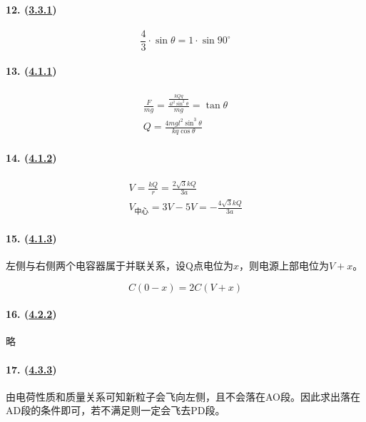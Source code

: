 \paragraph{12. (\hyperref[subsec:3.3.1]{3.3.1})}

\begin{equation*}
    \frac43\cdot\sin\theta=1\cdot\sin90^\circ
\end{equation*}

\paragraph{13. (\hyperref[subsec:4.1.1]{4.1.1})}

\begin{gather*}
    \frac{F}{mg}=\frac{\frac{kQq}{4l^2\sin^2\theta}}{mg}=\tan\theta\\
    Q=\frac{4mgl^2\sin^3\theta}{kq\cos\theta}
\end{gather*}

\paragraph{14. (\hyperref[subsec:4.1.2]{4.1.2})}

\begin{gather*}
    V=\frac{kQ}{r}=\frac{2\sqrt{3}kQ}{3a}\\
    V_\textrm{中心}=3V-5V=-\frac{4\sqrt{3}kQ}{3a}
\end{gather*}

\paragraph{15. (\hyperref[subsec:4.1.3]{4.1.3})} 左侧与右侧两个电容器属于并联关系，设Q点电位为$x$，则电源上部电位为$V+x$。

\begin{equation*}
    C(0-x)=2C(V+x)
\end{equation*}

\paragraph{16. (\hyperref[subsec:4.2.2]{4.2.2})} 略
\paragraph{17. (\hyperref[subsec:4.3.3]{4.3.3})} 由电荷性质和质量关系可知新粒子会飞向左侧，且不会落在AO段。因此求出落在AD段的条件即可，若不满足则一定会飞去PD段。

